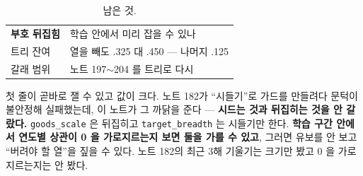\documentclass[10pt]{article}
\begin{document}
\begin{table}[t]
\centering\tsize
\caption{남은 것.}
\begin{tabular}{ll}
\toprule
\textbf{부호 뒤집힘} & 학습 안에서 미리 잡을 수 있나 \\
트리 잔여 & 열을 빼도 .325 대 .450 --- 나머지 .125 \\
갈래 범위 & 노트 197$\sim$204 를 트리로 다시 \\
\bottomrule
\end{tabular}
\end{table}

첫 줄이 곧바로 잴 수 있고 값이 크다. 노트 182가 ``시들기''로 가드를 만들려다
문턱이 불안정해 실패했는데, 이 노트가 그 까닭을 준다 --- \textbf{시드는
것과 뒤집히는 것을 안 갈랐다.} \texttt{goods\_scale} 은 뒤집히고
\texttt{target\_breadth} 는 시들기만 한다. \textbf{학습 구간 안에서 연도별
상관이 0 을 가로지르는지 보면 둘을 가를 수 있고}, 그러면 유보를 안 보고
``버려야 할 열''을 짚을 수 있다. 노트 182의 최근 3해 기울기는 크기만 봤고
0 을 가로지르는지는 안 봤다.
\end{document}
